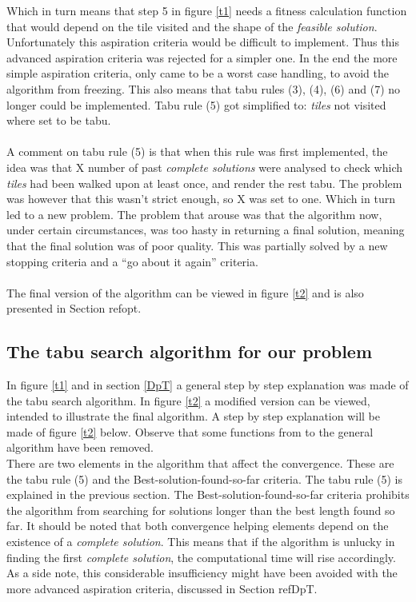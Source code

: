 Which in turn means that step 5 in figure \ref{t1} needs a fitness calculation function that would depend on the tile visited and the shape of the \emph{feasible solution}. Unfortunately this aspiration criteria would be difficult to implement. Thus this advanced aspiration criteria was rejected for a simpler one. In the end the more simple aspiration criteria, only came to be a worst case handling, to avoid the algorithm from freezing. This also means that tabu rules (3), (4), (6) and (7) no longer could be implemented. Tabu rule (5) got simplified to: \emph{tiles} not visited where set to be tabu.\\
\\A comment on tabu rule (5) is that when this rule was first implemented, the idea was that X number of past \emph{complete solutions} were analysed to check which \emph{tiles} had been walked upon at least once, and render the rest tabu. The problem was however that this wasn't strict enough, so X was set to one. Which in turn led to a new problem. The problem that arouse was that the algorithm now, under certain circumstances, was too hasty in returning a final solution, meaning that the final solution was of poor quality. This was partially solved by a new stopping criteria and a ``go about it again'' criteria.\\
\\The final version of the algorithm can be viewed in figure \ref{t2} and is also presented in Section ref{opt}.
\subsection{The tabu search algorithm for our problem}\label{opt}
In figure \ref{t1} and in section \ref{DpT} a general step by step explanation was made of the tabu search algorithm. In figure \ref{t2} a modified version can be viewed, intended to illustrate the final algorithm. A step by step explanation will be made of figure \ref{t2} below. Observe that some functions from to the general algorithm have been removed.\\

There are two elements in the algorithm that affect the convergence. These are the tabu rule (5) and the Best-solution-found-so-far criteria. The tabu rule (5) is explained in the previous section. The Best-solution-found-so-far criteria prohibits the algorithm from searching for solutions longer than the best length found so far. It should be noted that both convergence helping elements depend on the existence of a \emph{complete solution}. This means that if the algorithm is unlucky in finding the first \emph{complete solution}, the computational time will rise accordingly. As a side note, this considerable insufficiency might have been avoided with the more advanced aspiration criteria, discussed in Section ref{DpT}.


